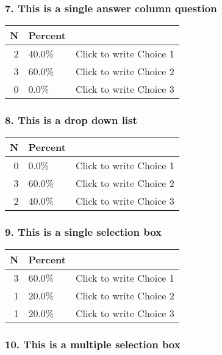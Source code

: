 \documentclass{article}\usepackage[]{graphicx}\usepackage[]{color}
\begin{document}
\hfill \break \hfill \break
\subsubsection*{7.
This is a single answer column question}

\begin{tabular}{r|l|l}
\hline
N & Percent & \\
\hline
2 & 40.0\% & Click to write Choice 1\\
\hline
3 & 60.0\% & Click to write Choice 2\\
\hline
0 & 0.0\% & Click to write Choice 3\\
\hline
\end{tabular}


\hfill \break \hfill \break
\subsubsection*{8.
This is a drop down list}

\begin{tabular}{r|l|l}
\hline
N & Percent & \\
\hline
0 & 0.0\% & Click to write Choice 1\\
\hline
3 & 60.0\% & Click to write Choice 2\\
\hline
2 & 40.0\% & Click to write Choice 3\\
\hline
\end{tabular}


\hfill \break \hfill \break
\subsubsection*{9.
This is a single selection box}

\begin{tabular}{r|l|l}
\hline
N & Percent & \\
\hline
3 & 60.0\% & Click to write Choice 1\\
\hline
1 & 20.0\% & Click to write Choice 2\\
\hline
1 & 20.0\% & Click to write Choice 3\\
\hline
\end{tabular}


\hfill \break \hfill \break
\subsubsection*{10.
This is a multiple selection box}

\hfill \break \hfill \break
\end{document}
